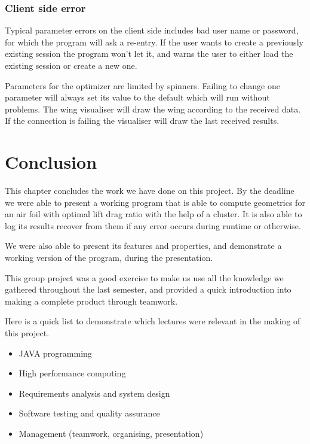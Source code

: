 \documentclass[10pt,a4paper]{report}
\begin{document}
\subsection{Client side error}
Typical parameter errors on the client side includes bad user name or password, for which the program will ask a re-entry. If the user wants to create a previously existing session the program won't let it, and warns the user to either load the existing session or create a new one.

Parameters for the optimizer are limited by spinners. Failing to change one parameter will always set its value to the default which will run without problems. The wing visualiser will draw the wing according to the received data. If the connection is failing the visualiser will draw the last received results.


\chapter{Conclusion}
\label{ch:conc}
This chapter concludes the work we have done on this project. By the deadline we were able to present a working program that is able to compute geometrics for an air foil with optimal lift drag ratio with the help of a cluster. It is also able to log its results recover from them if any error occurs during runtime or otherwise. 

We were also able to present its features and properties, and demonstrate a working version of the program, during the presentation. 

This group project was a good exercise to make us use all the knowledge we gathered throughout the last semester, and provided a quick introduction into making a complete product through teamwork.

Here is a quick list to demonstrate which lectures were relevant in the making of this project.
\begin{itemize}
	\item JAVA programming
	\item High performance computing
	\item Requirements analysis and system design
	\item Software testing and quality assurance
	\item Management (teamwork, organising, presentation)
\end{itemize}

\begin{flushleft}
	
	
\end{flushleft}
\end{document}
